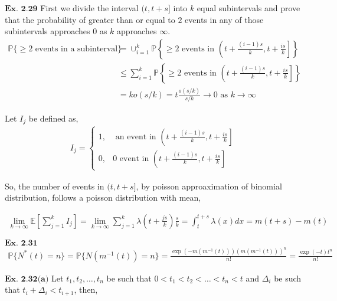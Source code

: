 \documentclass{article}
\begin{document}
\vspace{0.2in}
${\textbf{Ex. 2.29}}$
First we divide the interval $(t,t+s]$ into $k$ equal subintervals and prove that the probability of greater than or equal to $2$ events in any of those subintervals approaches $0$ as $k$ approaches $\infty$.
\begin{align*}
\mathbb{P}\{\geq 2 \text{ events in a subinterval}\} &= \cup_{i=1}^{k}\mathbb{P}\left\{\geq 2 \text{ events in } \left(t+\frac{(i-1)s}{k},t+\frac{is}{k}\right]\right\}\\
&\leq \sum_{i=1}^{k}\mathbb{P}\left\{\geq 2 \text{ events in } \left(t+\frac{(i-1)s}{k},t+\frac{is}{k}\right]\right\}\\
&= ko(s/k) = t\frac{o(s/k)}{s/k} \rightarrow 0 \text{ as } k \rightarrow \infty
\end{align*}

Let $I_j$ be defined as,
\begin{align*}
I_j = \left\{\begin{matrix}1, & \text{ an event in }\left(t+\frac{(i-1)s}{k}, t+\frac{is}{k}\right]\\0, & 0\text{ event in }\left(t+\frac{(i-1)s}{k}, t+\frac{is}{k}\right]\end{matrix}\right.
\end{align*}

So, the number of events in $(t,t+s]$, by poisson approaximation of binomial distribution, follows a poisson distribution with mean,

\begin{align*}
\lim_{k\rightarrow \infty}\mathbb{E}\left[\sum_{j=1}^{k}I_j\right] = \lim_{k\rightarrow \infty} \sum_{j=1}^{k}\lambda\left(t+\frac{js}{k}\right)\frac{s}{k} = \int_{t}^{t+s}\lambda(x)dx = m(t+s)-m(t)
\end{align*}

\vspace{0.2in}
\begin{comment}
${\textbf{Ex. 2.30}}$

\vspace{0.2in}
\end{comment}
${\textbf{Ex. 2.31}}$
\begin{align*}
\mathbb{P}\{N^{*}(t) = n\} = \mathbb{P}\{N(m^{-1}(t)) = n\} = \frac{\exp(-m(m^{-1}(t)))(m(m^{-1}(t)))^{n}}{n!} = \frac{\exp(-t)t^n}{n!}
\end{align*}

\vspace{0.2in}
${\textbf{Ex. 2.32(a)}}$
Let $t_1,t_2,\ldots,t_n$ be such that $0 < t_1 < t_2 < \ldots < t_n < t$ and $\Delta_i$ be such that $t_i +\Delta_i < t_{i+1}$, then,
\end{document}
